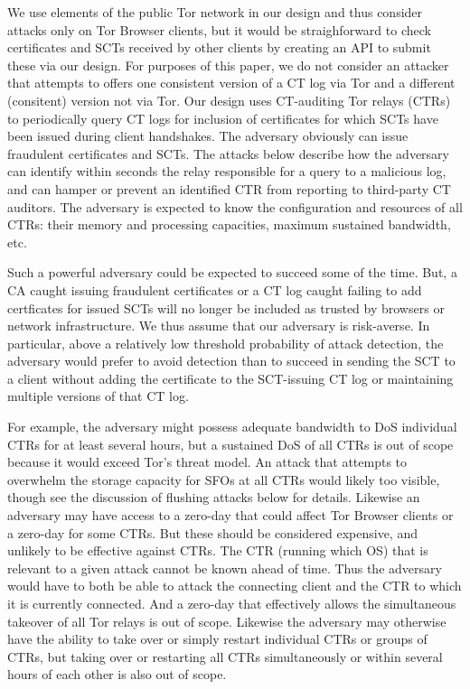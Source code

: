 We use elements of the public Tor network in our design and thus
consider attacks only on Tor Browser clients, but it would be
straighforward to check certificates and SCTs received by other
clients by creating an API to submit these via our design. For
purposes of this paper, we do not consider an attacker that attempts
to offers one consistent version of a CT log via Tor and a different
(consitent) version not via Tor.  Our design uses CT-auditing Tor
relays (CTRs) to periodically query CT logs for inclusion of
certificates for which SCTs have been issued during client
handshakes. The adversary obviously can issue fraudulent certificates
and SCTs. The attacks below describe how the adversary can identify
within seconds the relay responsible for a query to a malicious log,
and can hamper or prevent an identified CTR from reporting to
third-party CT auditors.
The adversary is expected to know the configuration and resources of
all CTRs: their memory and processing capacities, maximum sustained
bandwidth, etc. 

Such a powerful adversary could be expected to succeed some of the
time.  But, a CA caught issuing fraudulent certificates or a CT log
caught failing to add certficates for issued SCTs will no longer be
included as trusted by browsers or network infrastructure. We thus
assume that our adversary is risk-averse.  In particular, above a
relatively low threshold probability of attack detection, the
adversary would prefer to avoid detection than to succeed in sending
the SCT to a client without adding the certificate to the SCT-issuing
CT log or maintaining multiple versions of that CT log. 

For example, the adversary might possess adequate bandwidth to DoS
individual CTRs for at least several hours, but a sustained DoS of all
CTRs is out of scope because it would exceed Tor's threat model. An
attack that attempts to overwhelm the storage capacity for SFOs at all
CTRs would likely too visible, though see the discussion of flushing
attacks below for details. Likewise an adversary may have access to a
zero-day that could affect Tor Browser clients or a zero-day for some
CTRs. But these should be considered expensive, and unlikely to be
effective against CTRs.  The CTR (running which OS) that is relevant to a
given attack cannot be known ahead of time. Thus the adversary would
have to both be able to attack the connecting client and the CTR to
which it is currently connected. And a zero-day that effectively
allows the simultaneous takeover of all Tor relays is out of
scope. Likewise the adversary may otherwise have the ability to take
over or simply restart individual CTRs or groups of CTRs, but taking
over or restarting all CTRs simultaneously or within several hours of
each other is also out of scope.

